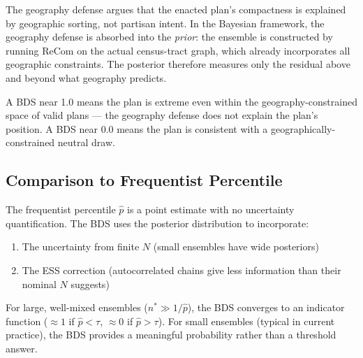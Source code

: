 The geography defense argues that the enacted plan's compactness is explained
by geographic sorting, not partisan intent. In the Bayesian framework, the
geography defense is absorbed into the \emph{prior}: the ensemble is constructed
by running ReCom on the actual census-tract graph, which already incorporates
all geographic constraints. The posterior therefore measures only the residual
above and beyond what geography predicts.

A BDS near 1.0 means the plan is extreme even within the geography-constrained
space of valid plans — the geography defense does not explain the plan's position.
A BDS near 0.0 means the plan is consistent with a geographically-constrained
neutral draw.

\subsection{Comparison to Frequentist Percentile}

The frequentist percentile $\hat{p}$ is a point estimate with no uncertainty
quantification. The BDS uses the posterior distribution to incorporate:
\begin{enumerate}
  \item The uncertainty from finite $N$ (small ensembles have wide posteriors)
  \item The ESS correction (autocorrelated chains give less information than
    their nominal $N$ suggests)
\end{enumerate}
For large, well-mixed ensembles ($n^* \gg 1/\hat{p}$), the BDS converges to
an indicator function ($\approx 1$ if $\hat{p} < \tau$, $\approx 0$ if
$\hat{p} > \tau$). For small ensembles (typical in current practice), the BDS
provides a meaningful probability rather than a threshold answer.
